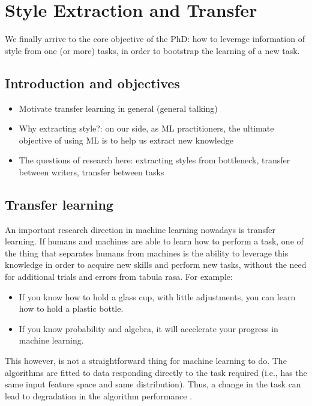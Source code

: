 \chapter{Style Extraction and Transfer}
\minitoc%

\par We finally arrive to the core objective of the PhD: how to leverage information of style from one (or more) tasks, in order to bootstrap the learning of a new task.

\section{Introduction and objectives}
\begin{itemize}[noitemsep]
    \item Motivate transfer learning in general (general talking)
    \item Why extracting style?: on our side, as ML practitioners, the ultimate objective of using ML is to help us extract new knowledge
    \item The questions of research here: extracting styles from bottleneck, transfer between writers, transfer between tasks
\end{itemize}

\section{Transfer learning}\label{sec:transfer_learning}
\par An important research direction in machine learning nowadays is transfer learning. If humans and machines are able to learn how to perform a task, one of the thing that separates humans from machines is the ability to leverage this knowledge in order to acquire new skills and perform new tasks, without the need for additional trials and errors from tabula rasa. For example:
\begin{itemize}[noitemsep]
    \item If you know how to hold a glass cup, with little adjustments, you can learn how to hold a plastic bottle.
    \item If you know probability and algebra, it will accelerate your progress in machine learning.
\end{itemize}
This however, is not a straightforward thing for machine learning to do. The algorithms are fitted to data responding directly to the task required (i.e., has the same input feature space and same distribution). Thus, a change in the task can lead to degradation in the algorithm performance \citep{shimodaira2000improving,weiss2016survey}.

